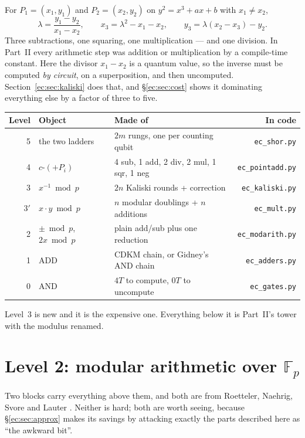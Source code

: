 \documentclass[11pt]{article}
\newcommand{\ADD}{\mathrm{ADD}}
\newcommand{\code}[1]{\texttt{#1}}
\theoremstyle{plain}
\theoremstyle{remark}
\begin{document}
For $P_1=(x_1,y_1)$ and $P_2=(x_2,y_2)$ on $y^2=x^3+ax+b$ with $x_1\neq x_2$,
\begin{equation}\label{ec:eq:add}
\lambda=\frac{y_1-y_2}{x_1-x_2},\qquad
x_3=\lambda^2-x_1-x_2,\qquad
y_3=\lambda(x_2-x_3)-y_2 .
\end{equation}
Three subtractions, one squaring, one multiplication --- and one division. In Part~II every
arithmetic step was addition or multiplication by a compile-time constant. Here the divisor
$x_1-x_2$ is a quantum value, so the inverse must be computed \emph{by circuit}, on a
superposition, and then uncomputed. Section~\ref{ec:sec:kaliski} does that, and
\S\ref{ec:sec:cost} shows it dominating everything else by a factor of three to five.

\begin{center}\small\setlength{\tabcolsep}{5pt}
\begin{tabular}{@{}rllr@{}}
\toprule
Level & Object & Made of & In code\\
\midrule
5 & the two ladders & $2m$ rungs, one per counting qubit & \code{ec\_shor.py}\\
4 & $c$-$(+P_i)$ & 4 sub, 1 add, 2 div, 2 mul, 1 sqr, 1 neg & \code{ec\_pointadd.py}\\
3 & $x^{-1}\bmod p$ & $2n$ Kaliski rounds + correction & \code{ec\_kaliski.py}\\
3$'$ & $x\cdot y\bmod p$ & $n$ modular doublings + $n$ additions & \code{ec\_mult.py}\\
2 & $\pm\bmod p$, $2x\bmod p$ & plain add/sub plus one reduction & \code{ec\_modarith.py}\\
1 & $\ADD$ & CDKM chain, or Gidney's AND chain & \code{ec\_adders.py}\\
0 & AND & $4T$ to compute, $0T$ to uncompute & \code{ec\_gates.py}\\
\bottomrule
\end{tabular}
\end{center}

\noindent
Level~3 is new and it is the expensive one. Everything below it is Part~II's tower with the
modulus renamed.

\section{Level 2: modular arithmetic over $\mathbb{F}_p$}\label{ec:sec:modarith}

Two blocks carry everything above them, and both are from Roetteler, Naehrig, Svore and Lauter
\cite{ec:rnsl17}. Neither is hard; both are worth seeing, because \S\ref{ec:sec:approx} makes its
savings by attacking exactly the parts described here as ``the awkward bit''.
\end{document}

